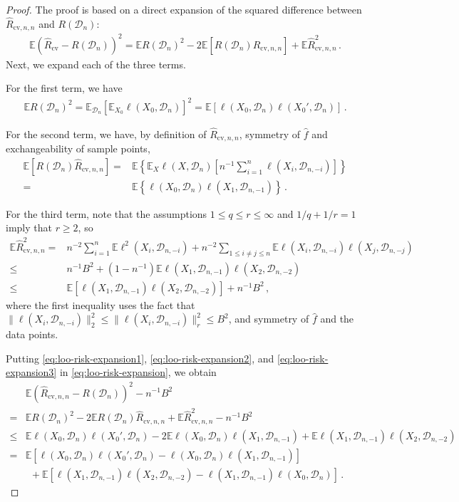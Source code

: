 \documentclass[11pt]{article}
\theoremstyle{plain}
\newcommand{\cv}{{\mathrm{cv}}}
\newcommand{\D}{{\mathcal{D}}}
\begin{document}
\begin{proof}
The proof is based on a direct expansion of the squared difference between $\hat R_{\cv,n,n}$ and $R(\D_n)$:
\begin{align}
    \mathbb E (\hat R_\cv-R(\D_n))^2 = \mathbb E R(\D_n)^2- 2\mathbb E \left[R(\D_n)\hat R_{\cv,n,n}\right] + \mathbb E \hat R_{\cv,n,n}^2\,. \label{eq:loo-risk-expansion}
\end{align}
Next, we expand each of the three terms.

For the first term, we have
    \begin{align}
    \mathbb E R(\D_n)^2=\mathbb E_{\D_n}\left[\mathbb E_{X_0}\ell(X_0,\D_n)\right]^2 = \mathbb E \left[\ell(X_0,\D_n)\ell(X_0',\D_n)\right]\,.\label{eq:loo-risk-expansion1}
\end{align}

For the second term, we have, by definition of $\hat R_{\cv,n,n}$, symmetry of $\hat f$ and exchangeability of sample points,
\begin{align}
    \mathbb E \left[R(\D_n) \hat R_{\cv,n,n}\right] = & \mathbb E \left\{\mathbb E_X \ell(X,\D_n)\left[n^{-1}\sum_{i=1}^n\ell(X_i,\D_{n,-i})\right]\right\}\nonumber\\
    = &  \mathbb E \left\{\ell(X_0,\D_n)\ell(X_1, \D_{n,-1})\right\}\,.\label{eq:loo-risk-expansion2}
\end{align}

For the third term, note that the assumptions $1\le q\le r\le\infty$ and $1/q+1/r=1$ imply that $r\ge 2$, so
\begin{align}
    \mathbb E \hat R_{\cv,n,n}^2 = & n^{-2}\sum_{i=1}^n\mathbb E\ell^2(X_i,\D_{n,-i})+n^{-2}\sum_{1\le i\neq j\le n}\mathbb E \ell(X_i,\D_{n,-i})\ell(X_j,\D_{n,-j})\nonumber\\
    \le & n^{-1}B^2+(1-n^{-1})\mathbb E\ell(X_1,\D_{n,-1})\ell(X_2,\D_{n,-2})\nonumber\\
    \le & \mathbb E[\ell(X_1,\D_{n,-1})\ell(X_2,\D_{n,-2})]+n^{-1}B^2\,,\label{eq:loo-risk-expansion3}
\end{align}
where the first inequality uses the fact that $\|\ell(X_i,\D_{n,-i})\|_2^2\le \|\ell(X_i,\D_{n,-i})\|_r^2\le B^2$, and symmetry of $\hat f$ and the data points.

Putting \eqref{eq:loo-risk-expansion1}, \eqref{eq:loo-risk-expansion2}, and \eqref{eq:loo-risk-expansion3} in \eqref{eq:loo-risk-expansion}, we obtain
\begin{align}
    &\mathbb E (\hat R_{\cv,n,n}-R(\D_n))^2-n^{-1}B^2\nonumber\\ 
    = &\mathbb E R(\D_n)^2- 2\mathbb E R(\D_n)\hat R_{\cv,n,n} + \mathbb E \hat R_{\cv,n,n}^2-n^{-1}B^2\nonumber\\
    \le & \mathbb E\ell(X_0,\D_n)\ell(X_0',\D_n)-2\mathbb E \ell(X_0,\D_n)\ell(X_1, \D_{n,-1})+\mathbb E\ell(X_1,\D_{n,-1})\ell(X_2,\D_{n,-2})\nonumber\\
    = & \mathbb E\left[\ell(X_0,\D_n)\ell(X_0',\D_n)-\ell(X_0,\D_n)\ell(X_1,\D_{n,-1})\right]\nonumber\\
     &~~+ \mathbb E \left[\ell(X_1,\D_{n,-1})\ell(X_2,\D_{n,-2})-\ell(X_1,\D_{n,-1})\ell(X_0,\D_n)\right]\,.\label{eq:roo-risk-exp-simple}
\end{align}


\end{proof}
\end{document}
